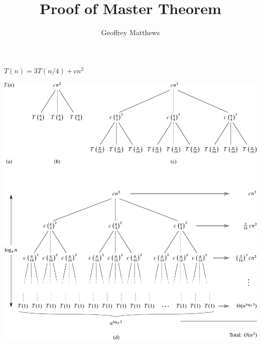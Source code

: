 \documentclass{article}
\title{Proof of Master Theorem}
\author{Geoffrey Matthews}
\begin{document}
\maketitle
\centerline{\Large $T(n) = 3T(n/4) + cn^2$}
\hrulefill

\includegraphics[width=\textwidth]{Fig-4-5.pdf}
\end{document}
